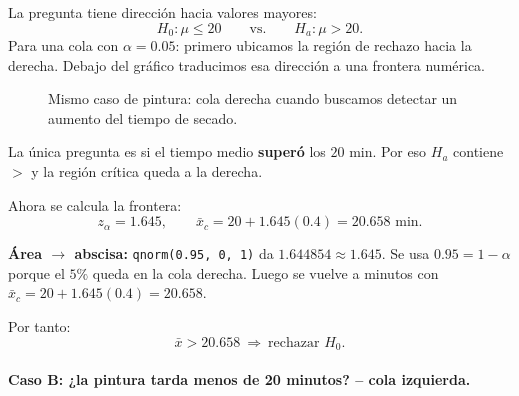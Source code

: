 \documentclass[11pt,a4paper]{article}
\begin{document}
La pregunta tiene dirección hacia valores mayores:
\[
H_0:\mu\le20
\qquad\text{vs.}\qquad
H_a:\mu>20.
\]
Para una cola con $\alpha=0.05$:
primero ubicamos la región de rechazo hacia la derecha. Debajo del gráfico traducimos esa dirección a una frontera numérica.

\begin{figure}[H]
\centering
{}
\caption{Mismo caso de pintura: cola derecha cuando buscamos detectar un aumento del tiempo de secado.}
\end{figure}

\begin{observargrafico}
La única pregunta es si el tiempo medio \textbf{superó} los $20$ min. Por eso $H_a$ contiene $>$ y la región crítica queda a la derecha.
\end{observargrafico}

Ahora se calcula la frontera:
\[
z_{\alpha}=1.645,\qquad
\bar{x}_c=20+1.645(0.4)=20.658\text{ min}.
\]
\begin{calculor}
\textbf{Área $\rightarrow$ abscisa:} \texttt{qnorm(0.95, 0, 1)} da $1.644854\approx1.645$. Se usa $0.95=1-\alpha$ porque el $5\%$ queda en la cola derecha. Luego se vuelve a minutos con $\bar{x}_c=20+1.645(0.4)=20.658$.
\end{calculor}
Por tanto:
\[
\boxed{\bar{x}>20.658\ \Rightarrow\ \text{rechazar }H_0.}
\]

\paragraph{Caso B: ¿la pintura tarda menos de 20 minutos? -- cola izquierda.}
\end{document}
